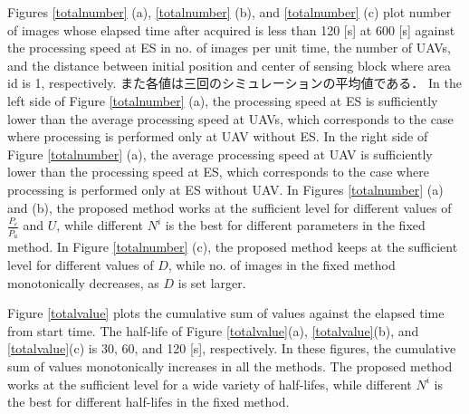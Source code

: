 \documentclass{ieeeaccess}
\begin{document}
Figures \ref{totalnumber} (a), \ref{totalnumber} (b), and \ref{totalnumber} (c) plot number of images whose elapsed time after acquired is less than 120 [s] at 600 [s] against the processing speed at ES in no. of images per unit time, the number of UAVs, and the distance between initial position and center of sensing block where area id is 1, respectively.
また各値は三回のシミュレーションの平均値である．
In the left side of Figure \ref{totalnumber} (a), the processing speed at ES is sufficiently lower than the average processing speed at UAVs, which corresponds to the case where processing is performed only at UAV without ES.
In the right side of Figure \ref{totalnumber} (a), the average processing speed at UAV is sufficiently lower than the processing speed at ES, which corresponds to the case where processing is performed only at ES without UAV.
In Figures \ref{totalnumber} (a) and (b), the proposed method works at the sufficient level for different values of $\frac{P_e}{\overline{P_u}}$ and $U$, while different $N^i$ is the best for different parameters in the fixed method.
In Figure \ref{totalnumber} (c), the proposed method keeps at the sufficient level for different values of $D$, while no. of images in the fixed method monotonically decreases, as $D$ is set larger.

Figure \ref{totalvalue} plots the cumulative sum of values against the elapsed time from start time.
The half-life of Figure \ref{totalvalue}(a), \ref{totalvalue}(b), and \ref{totalvalue}(c) is 30, 60, and 120 [s], respectively.
In these figures, the cumulative sum of values monotonically increases in all the methods.
The proposed method works at the sufficient level for a wide variety of half-lifes, while different $N^i$ is the best for different half-lifes in the fixed method.
\end{document}

